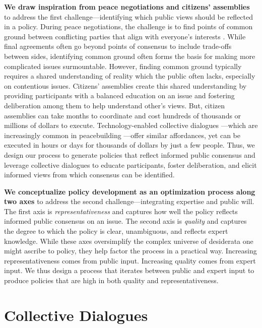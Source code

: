 \documentclass{article}
\begin{document}
\textbf{We draw inspiration from peace negotiations and citizens' assemblies} to address the first challenge---identifying which public views should be reflected in a policy. During peace negotiations, the challenge is to find points of common ground between conflicting parties that align with everyone's interests \cite{manual2010peck,guidence2012united}. While final agreements often go beyond points of consensus to include trade-offs between sides, identifying common ground often forms the basis for making more complicated issues surmountable. However, finding common ground typically requires a shared understanding of reality which the public often lacks, especially on contentious issues. Citizens’ assemblies \cite{oecd2020innovative} create this shared understanding by providing participants with a balanced education on an issue and fostering deliberation among them to help understand other’s views. But, citizen assemblies can take months to coordinate and cost hundreds of thousands or millions of dollars to execute. Technology-enabled collective dialogues ---which are increasingly common in peacebuilding \cite{UN2021williams,irwin2021using,UN2021jeanine,UN2020cutting,UN2022lynn,UN2023carol,UN2023liita,bilich2019faster}---offer similar affordances, yet can be executed in hours or days for thousands of dollars by just a few people. Thus, we design our process to generate policies that reflect informed public consensus and leverage collective dialogues to educate participants, foster deliberation, and elicit informed views from which consensus can be identified. 

\textbf{We conceptualize policy development as an optimization process along two axes} to address the second challenge---integrating expertise and public will. The first axis is \emph{representativeness} and captures how well the policy reflects informed public consensus on an issue. The second axis is \emph{quality} and captures the degree to which the policy is clear, unambiguous, and reflects expert knowledge. While these axes oversimplify the complex universe of desiderata one might ascribe to policy, they help factor the process in a practical way. Increasing representativeness comes from public input. Increasing quality comes from expert input. We thus design a process that iterates between public and expert input to produce policies that are high in both quality and representativeness.



\section{Collective Dialogues}
\end{document}
